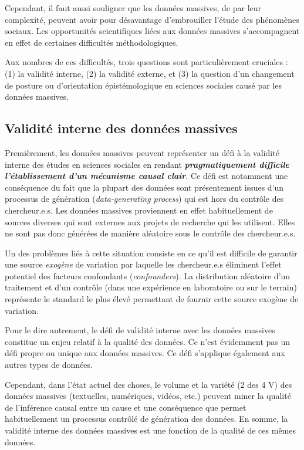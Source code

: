 \documentclass[
  letterpaper,
]{scrbook}
\begin{document}
Cependant, il faut aussi souligner que les données massives, de par leur
complexité, peuvent avoir pour désavantage d'embrouiller l'étude des
phénomènes sociaux. Les opportunités scientifiques liées aux données
massives s'accompagnent en effet de certaines difficultés
méthodologiques.

Aux nombres de ces difficultés, trois questions sont particulièrement
cruciales : (1) la validité interne, (2) la validité externe, et (3) la
question d'un changement de posture ou d'orientation épistémologique en
sciences sociales causé par les données massives.

\hypertarget{validituxe9-interne-des-donnuxe9es-massives}{%
\subsection{Validité interne des données
massives}\label{validituxe9-interne-des-donnuxe9es-massives}}

Premièrement, les données massives peuvent représenter un défi à la
validité interne des études en sciences sociales en rendant
\textbf{\emph{pragmatiquement difficile l'établissement d'un mécanisme
causal clair}}. Ce défi est notamment une conséquence du fait que la
plupart des données sont présentement issues d'un processus de
génération (\emph{data-generating process}) qui est hors du contrôle des
chercheur.e.s. Les données massives proviennent en effet habituellement
de sources diverses qui sont externes aux projets de recherche qui les
utilisent. Elles ne sont pas donc générées de manière aléatoire sous le
contrôle des chercheur.e.s.

Un des problèmes liés à cette situation consiste en ce qu'il est
difficile de garantir une source \emph{exogène} de variation par
laquelle les chercheur.e.s éliminent l'effet potentiel des facteurs
confondants (\emph{confounders}). La distribution aléatoire d'un
traitement et d'un contrôle (dans une expérience en laboratoire ou sur
le terrain) représente le standard le plus élevé permettant de fournir
cette source exogène de variation.

Pour le dire autrement, le défi de validité interne avec les données
massives constitue un enjeu relatif à la qualité des données. Ce n'est
évidemment pas un défi propre ou unique aux données massives. Ce défi
s'applique également aux autres types de données.

Cependant, dans l'état actuel des choses, le volume et la variété (2 des
4 V) des données massives (textuelles, numériques, vidéos, etc.) peuvent
miner la qualité de l'inférence causal entre un cause et une conséquence
que permet habituellement un processus contrôlé de génération des
données. En somme, la validité interne des données massives est une
fonction de la qualité de ces mêmes données.~
\end{document}
